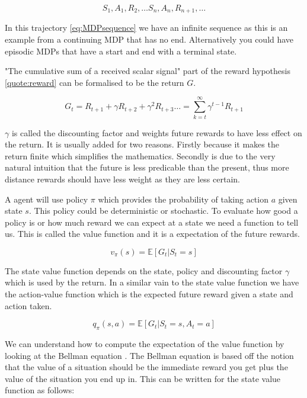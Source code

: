 \begin{equation}
S_{1},A_{1},R_{2},\dots S_{n},A_{n}, R_{n+1},\dots 
\label{eq:MDPsequence}
\end{equation}

In this trajectory \ref{eq:MDPsequence} we have an infinite sequence as this is an example from a continuing MDP that has no end. Alternatively you could have episodic MDPs that have a start and end with a terminal state.

"The cumulative sum of a received scalar signal" part of the reward hypothesis \ref{quote:reward} can be formalised to be the return $G$.

\begin{equation}
G_{t}=R_{t+1}+\gamma R_{t+2}+\gamma^{2}R_{t+3}\dots=\sum_{k=t}^{\infty}\gamma^{t-1}R_{t+1}
\end{equation}

$\gamma$ is called the discounting factor and weights future rewards to have less effect on the return. It is usually added for two reasons. Firstly because it makes the return finite which simplifies the mathematics. Secondly is due to the very natural intuition that the future is less predicable than the present, thus more distance rewards should have less weight as they are less certain. 


A agent will use policy $\pi$ which provides the probability of taking action $a$ given state $s$. This policy could be deterministic or stochastic.
To evaluate how good a policy is or how much reward we can expect at a state we need a function to tell us. This is called the value function and it is a expectation of the future rewards.

\begin{equation}
v_{\pi}(s)=\mathbb{E}\left[ G_{t}| S_{t}=s\right] 
\end{equation}

The state value function depends on the state, policy and discounting factor $\gamma$ which is used by the return. In a similar vain to the state value function we have the action-value function which is the expected future reward given a state and action taken.

\begin{equation}
q_{\pi}(s,a) = \mathbb{E}\left[ G_{t} | S_{t}=s, A_{t}=a \right] 
\end{equation}

We can understand how to compute the expectation of the value function by looking at the Bellman equation \cite{suttonReinforcementLearningSecond2018}. The Bellman equation is based off the notion that the value of a situation should be the immediate reward you get plus the value of the situation you end up in. This can be written for the state value function as follows:

